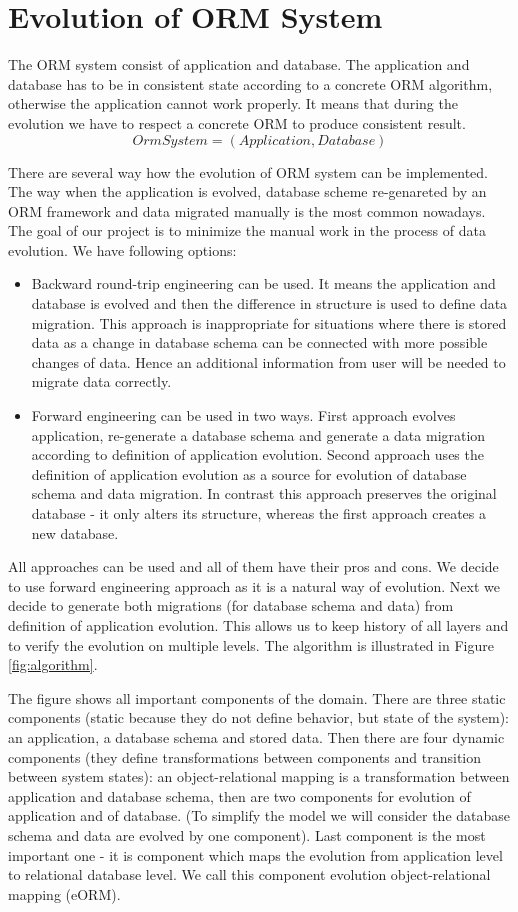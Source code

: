 \documentclass[11pt]{article}
\begin{document}
\tableofcontents

\newpage
\section{Evolution of ORM System}
The ORM system consist of application and database. The application and database has to be in consistent state according to a concrete ORM algorithm, otherwise the application cannot work properly. It means that during the evolution we have to respect a concrete ORM to produce consistent result.
$$
OrmSystem = (Application, Database)
$$

There are several way how the evolution of ORM system can be implemented. The way when the application is evolved, database scheme re-genareted by an ORM framework and data migrated manually is the most common nowadays. The goal of our project is to minimize the manual work in the process of data evolution. We have following options:
\begin{itemize}
	\item Backward round-trip engineering can be used. It means the application and database is evolved and then the difference in structure is used to define data migration. This approach is inappropriate for situations where there is stored data as a change in database schema can be connected with more possible changes of data. Hence an additional information from user will be needed to migrate data correctly.
    \item Forward engineering can be used in two ways. First approach evolves application, re-generate a database schema and generate a data migration according to definition of application evolution. Second approach uses the definition of application evolution as a source for evolution of database schema and data migration. In contrast this approach preserves the original database - it only alters its structure, whereas the first approach creates a new database.
\end{itemize}
All approaches can be used and all of them have their pros and cons. We decide to use forward engineering approach as it is a natural way of evolution. Next we decide to generate both migrations (for database schema and data) from definition of application evolution. This allows us to keep history of all layers and to verify the evolution on multiple levels. The algorithm is illustrated in Figure \ref{fig:algorithm}.

The figure shows all important components of the domain. There are three static components (static because they do not define behavior, but state of the system): an application, a database schema and stored data. Then there are four dynamic components (they define transformations between components and transition between system states): an object-relational mapping is a transformation between application and database schema, then are two components for evolution of application and of database. (To simplify the model we will consider the database schema and data are evolved by one component). Last component is the most important one - it is component which maps the evolution from application level to relational database level. We call this component evolution object-relational mapping (eORM).
 
\end{document}
